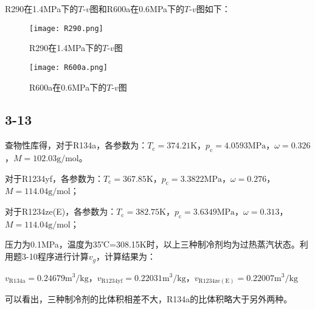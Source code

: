 \documentclass[12pt,a4paper]{article}
\begin{document}
R290在1.4MPa下的$T$-$v$图和R600a在0.6MPa下的$T$-$v$图如下：
\begin{figure}[h]
    \centering
    \texttt{[image: R290.png]}
    \caption{R290在1.4MPa下的$T$-$v$图}
\end{figure}

\begin{figure}[h]
    \centering
    \texttt{[image: R600a.png]}
    \caption{R600a在0.6MPa下的$T$-$v$图}
\end{figure}

\subsection*{3-13}
查物性库得，对于R134a，各参数为：$T_\mathrm{c}=374.21\mathrm{K}$，$p_\mathrm{c}=4.0593\mathrm{MPa}$，$\omega=0.326$，$M=102.03\mathrm{g/mol}$。

对于R1234yf，各参数为：$T_\mathrm{c}=367.85\mathrm{K}$，$p_\mathrm{c}=3.3822\mathrm{MPa}$，$\omega=0.276$，$M=114.04\mathrm{g/mol}$；

对于R1234ze(E)，各参数为：$T_\mathrm{c}=382.75\mathrm{K}$，$p_\mathrm{c}=3.6349\mathrm{MPa}$，$\omega=0.313$，$M=114.04\mathrm{g/mol}$；

压力为0.1MPa，温度为35℃=308.15K时，以上三种制冷剂均为过热蒸汽状态。利用题3-10程序进行计算$v_g$，计算结果为：

$v_\mathrm{R134a}=0.24679\mathrm{m^3/kg}$，$v_\mathrm{R1234yf}=0.22031\mathrm{m^3/kg}$，$v_\mathrm{R1234ze(E)}=0.22007\mathrm{m^3/kg}$

可以看出，三种制冷剂的比体积相差不大，R134a的比体积略大于另外两种。
\end{document}
